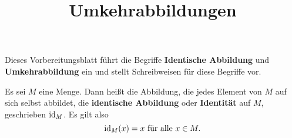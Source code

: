 \documentclass[]{uebungsblatt}
\title{Umkehrabbildungen}
\begin{document}
\maketitle
\begin{contents}
    Dieses Vorbereitungsblatt führt die Begriffe \textbf{Identische Abbildung} und \textbf{Umkehrabbildung} ein und stellt Schreibweisen für diese Begriffe vor.
\end{contents}
\begin{definition}
    Es sei $M$ eine Menge. Dann heißt die Abbildung, die jedes Element von $M$ auf sich selbst abbildet, die \textbf{identische Abbildung} oder \textbf{Identität} auf $M$, geschrieben $\ident[M]$. Es gilt also \[\ident[M](x)=x\text{~für alle~}x\in M.\]
\end{definition}
\end{document}
